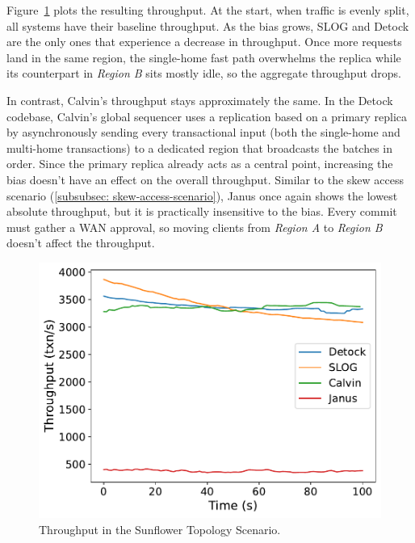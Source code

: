 Figure~\ref{fig: sunflower-throughput} plots the resulting throughput. At the start, when traffic is evenly split, all systems have their baseline throughput. As the bias grows, SLOG and Detock are the only ones that experience a decrease in throughput. Once more requests land in the same region, the single-home fast path overwhelms the replica while its counterpart in \textit{Region B} sits mostly idle, so the aggregate throughput drops.

In contrast, Calvin's throughput stays approximately the same. In the Detock codebase, Calvin's global sequencer uses a replication based on a primary replica by asynchronously sending every transactional input (both the single-home and multi-home transactions) to a dedicated region that broadcasts the batches in order. Since the primary replica already acts as a central point, increasing the bias doesn't have an effect on the overall throughput. Similar to the skew access scenario (\ref{subsubsec: skew-access-scenario}), Janus once again shows the lowest absolute throughput, but it is practically insensitive to the bias. Every commit must gather a WAN approval, so moving clients from \textit{Region A} to \textit{Region B} doesn't affect the throughput.

\begin{figure}[ht]
  \centering
  \includegraphics[width=\columnwidth]{figures/Sunflower Throughput.pdf}
  \caption{Throughput in the Sunflower Topology Scenario.}
  \label{fig: sunflower-throughput}
\end{figure}

